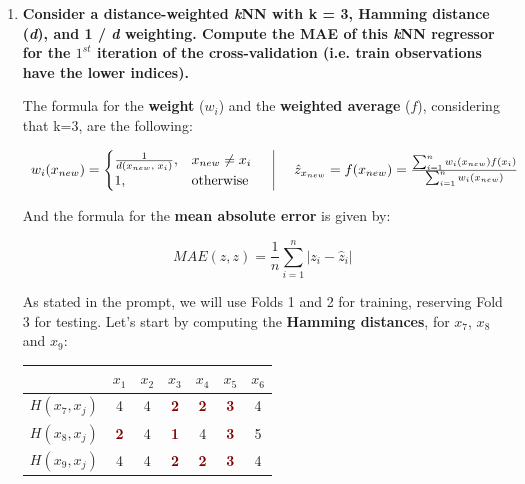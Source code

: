 \documentclass[12pt]{article}
\begin{document}
\begin{enumerate}[leftmargin=\labelsep]
\begin{enumerate}
    \item \textbf{Consider a distance-weighted \textit{k}NN with k = 3, Hamming distance (\textit{d}), and 1 / \textit{d} weighting.
          Compute the MAE of this \textit{k}NN regressor for the $1^{st}$ iteration of the cross-validation (i.e. train
          observations have the lower indices).}

          \vskip 0.3cm

          The formula for the \textbf{weight} ($w_i$) and the \textbf{weighted average} ($f$), considering that k=3, are the following:

          \begin{equation}\label{exI2-a-WA}
              \begin{array}{c|c}
                  \centering
                  w_i(x_{new})=
                  \begin{cases}
                      \frac{1}{d(x_{new},\; x_i)},& x_{new} \neq x_i\\
                      1,& \text{otherwise}
                  \end{cases}
                  \quad &
                  \quad
                  \hat{z}_{x_{new}} = f(x_{new}) = \frac{\sum_{i=1}^{n} w_i(x_{new}) f(x_i)}{\sum_{i=1}^{n} w_i(x_{new})}
              \end{array}
          \end{equation}

          And the formula for the \textbf{mean absolute error} is given by:

          \begin{equation}\label{exI2-a-MAE}
              MAE(\hat{z}, z) = \frac{1}{n} \sum_{i=1}^{n} \left| z_i - \hat{z}_i \right|
          \end{equation}

          As stated in the prompt, we will use Folds 1 and 2 for training, reserving Fold 3 for testing. Let's start by computing
          the \textbf{Hamming distances}, for $x_7$, $x_8$ and $x_9$:

           \begin{center}
            \begin{tabular}{c|cccccc}
                               & \(x_1\) & \(x_2\) & \(x_3\) & \(x_4\) & \(x_5\) &\(x_6\) \\
                \hline
                \(H(x_7,x_j)\) & 4 & 4 & \textcolor{Maroon}{\textbf{2}} & \textcolor{Maroon}{\textbf{2}} & \textcolor{Maroon}{\textbf{3}} & 4 \\
                \(H(x_8,x_j)\) & \textcolor{Maroon}{\textbf{2}} & 4 & \textcolor{Maroon}{\textbf{1}} & 4 & \textcolor{Maroon}{\textbf{3}} & 5 \\
                \(H(x_9,x_j)\) & 4 & 4 & \textcolor{Maroon}{\textbf{2}} & \textcolor{Maroon}{\textbf{2}} & \textcolor{Maroon}{\textbf{3}} & 4 \\
            \end{tabular}
          \end{center}


\end{enumerate}
\end{enumerate}
\end{document}
